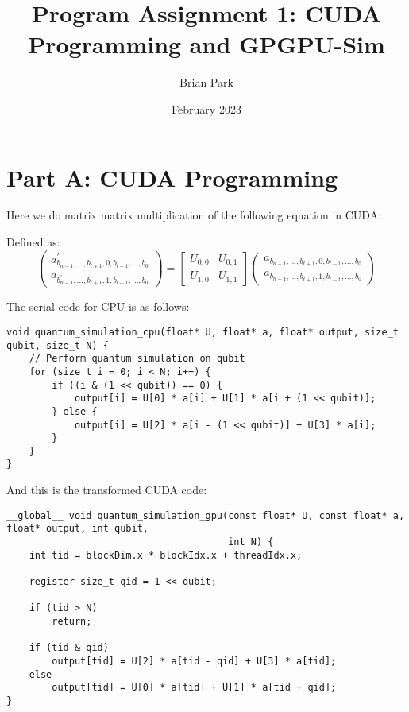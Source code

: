 \documentclass{article}
\title{Program Assignment 1: CUDA Programming and GPGPU-Sim}
\author{Brian Park}
\affil{North Carolina State University, Computer Engineering 786}
\date{February 2023}
\begin{document}
\maketitle

\section{Part A: CUDA Programming}

Here we do matrix matrix multiplication of the following equation in CUDA:

Defined as:
$$\left(\begin{array}{l}
			a_{b_{n-1}, \ldots, b_{t+1}, 0, b_{t-1}, \ldots, b_0}^{\prime} \\
			a_{b_{n-1}^{\prime}, \ldots, b_{t+1}, 1, b_{t-1}, \ldots, b_0}
		\end{array}\right)=\left[\begin{array}{ll}
			U_{0,0} & U_{0,1} \\
			U_{1,0} & U_{1,1}
		\end{array}\right]\left(\begin{array}{l}
			a_{b_{n-1}, \ldots, b_{t+1}, 0, b_{t-1}, \ldots, b_0} \\
			a_{b_{n-1}, \ldots, b_{t+1}, 1, b_{t-1}, \ldots, b_0}
		\end{array}\right)$$

The serial code for CPU is as follows:
\begin{verbatim}
void quantum_simulation_cpu(float* U, float* a, float* output, size_t qubit, size_t N) {
    // Perform quantum simulation on qubit
    for (size_t i = 0; i < N; i++) {
        if ((i & (1 << qubit)) == 0) {
            output[i] = U[0] * a[i] + U[1] * a[i + (1 << qubit)];
        } else {
            output[i] = U[2] * a[i - (1 << qubit)] + U[3] * a[i];
        }
    }
}    
\end{verbatim}

And this is the transformed CUDA code:
\begin{verbatim}
__global__ void quantum_simulation_gpu(const float* U, const float* a, float* output, int qubit,
                                       int N) {
    int tid = blockDim.x * blockIdx.x + threadIdx.x;

    register size_t qid = 1 << qubit;

    if (tid > N)
        return;

    if (tid & qid)
        output[tid] = U[2] * a[tid - qid] + U[3] * a[tid];
    else
        output[tid] = U[0] * a[tid] + U[1] * a[tid + qid];
}
\end{verbatim}
\end{document}
